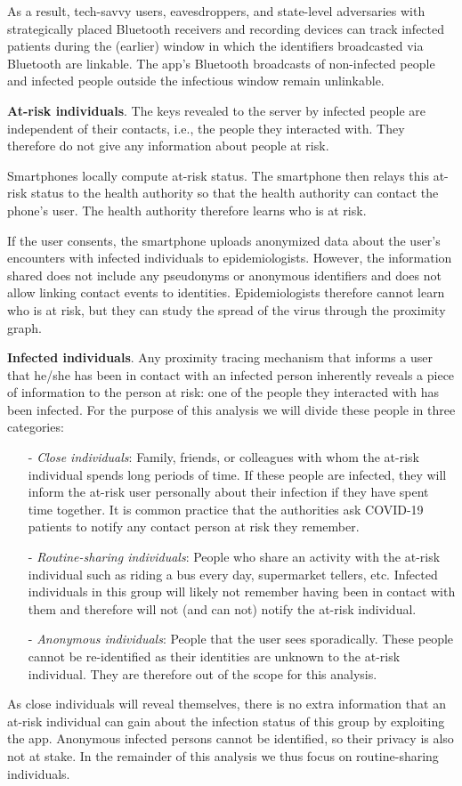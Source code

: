 \documentclass[12pt,a4paper]{article}
\begin{document}
As a result, tech-savvy users, eavesdroppers, and state-level adversaries with strategically placed Bluetooth receivers and recording devices can track infected patients during the (earlier) window in which the identifiers broadcasted via Bluetooth are linkable. The app’s Bluetooth broadcasts of non-infected people and infected people outside the infectious window remain unlinkable.

\textbf{At-risk individuals}. The keys revealed to the server by infected people are independent of their contacts, i.e., the people they interacted with. They therefore do not give any information about people at risk.

Smartphones locally compute at-risk status. The smartphone then relays this at-risk status to the health authority so that the health authority can contact the phone’s user. The health authority therefore learns who is at risk.

If the user consents, the smartphone uploads anonymized data about the user’s encounters
with infected individuals to epidemiologists. However, the information shared does not
include any pseudonyms or anonymous identifiers and does not allow linking contact events
to identities. Epidemiologists therefore cannot learn who is at risk, but they can study the spread of the virus through the proximity graph.

\textbf{Infected individuals}. Any proximity tracing mechanism that informs a user that he/she has been in contact with an infected person inherently reveals a piece of information to the person at risk: one of the people they interacted with has been infected. For the purpose of this analysis we will divide these people in three categories: 
\begin{itemize}\itemsep0pt
\item[-] \textit{Close individuals}: Family, friends, or colleagues with whom the at-risk individual spends long periods of time. If these people are infected, they will inform the at-risk user personally about their infection if they have spent time together. It is common practice that the authorities ask COVID-19 patients to notify any contact person at
risk they remember.
\item[-] \textit{Routine-sharing individuals}: People who share an activity with the at-risk individual such as riding a bus every day, supermarket tellers, etc. Infected individuals in this group will likely not remember having been in contact with them and therefore will not (and can not) notify the at-risk individual.
\item[-] \textit{Anonymous individuals}: People that the user sees sporadically. These people cannot be re-identified as their identities are unknown to the at-risk individual. They are therefore out of the scope for this analysis.
\end{itemize}
As close individuals will reveal themselves, there is no extra information that an at-risk
individual can gain about the infection status of this group by exploiting the app. Anonymous infected persons cannot be identified, so their privacy is also not at stake. In the remainder of this analysis we thus focus on routine-sharing individuals.
\end{document}
